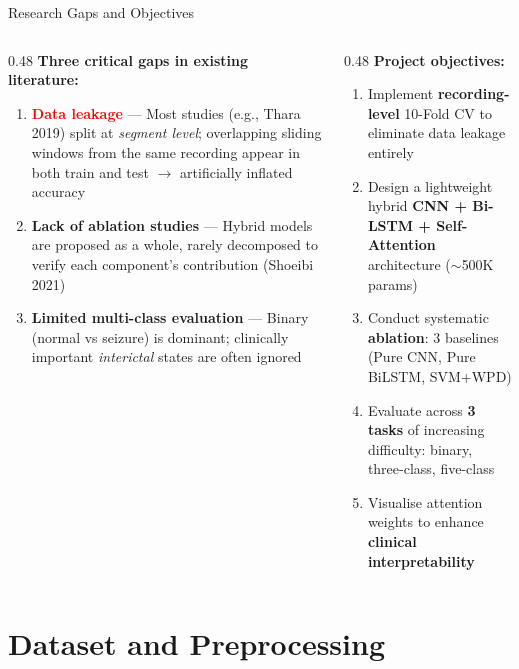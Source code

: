 \documentclass[aspectratio=169,12pt]{beamer}
\begin{document}
\begin{frame}[shrink=3]{Research Gaps and Objectives}
\begin{columns}[T]
\begin{column}{0.48\textwidth}
\textbf{Three critical gaps in existing literature:}
\begin{enumerate}\itemsep4pt\small
    \item \textcolor{red}{\textbf{Data leakage}} --- Most studies (e.g., Thara 2019) split at \textit{segment level}; overlapping sliding windows from the same recording appear in both train and test $\rightarrow$ artificially inflated accuracy
    \item \textbf{Lack of ablation studies} --- Hybrid models are proposed as a whole, rarely decomposed to verify each component's contribution (Shoeibi 2021)
    \item \textbf{Limited multi-class evaluation} --- Binary (normal vs seizure) is dominant; clinically important \textit{interictal} states are often ignored
\end{enumerate}
\end{column}
\begin{column}{0.48\textwidth}
\textbf{Project objectives:}
\begin{enumerate}\itemsep4pt\small
    \item Implement \textbf{recording-level} 10-Fold CV to eliminate data leakage entirely
    \item Design a lightweight hybrid \textbf{CNN + Bi-LSTM + Self-Attention} architecture ($\sim$500K params)
    \item Conduct systematic \textbf{ablation}: 3 baselines (Pure CNN, Pure BiLSTM, SVM+WPD)
    \item Evaluate across \textbf{3 tasks} of increasing difficulty: binary, three-class, five-class
    \item Visualise attention weights to enhance \textbf{clinical interpretability}
\end{enumerate}
\end{column}
\end{columns}
\end{frame}

\section{Dataset and Preprocessing}
\end{document}
